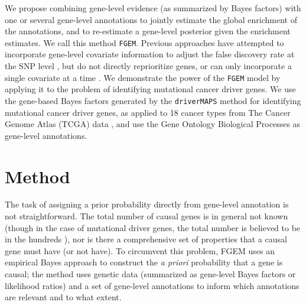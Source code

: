 We propose combining gene-level evidence (as summarized by Bayes factors) with one or several gene-level annotations to jointly estimate the global enrichment of the annotations, and to re-estimate a gene-level posterior given the enrichment estimates. We call this method \texttt{FGEM}.  Previous approaches have attempted to incorporate gene-level covariate information to adjust the false discovery rate at the SNP level \cite{Zablocki_2014}, but do not directly reprioritize genes, or can only incorporate a single covariate at a time \cite{rss-e}.  We demonstrate the power of the \texttt{FGEM} model by applying it to the problem of identifying mutational cancer driver genes. We use the gene-based Bayes factors generated by the \texttt{driverMAPS} method for identifying mutational cancer driver genes, as applied to 18 cancer types from The Cancer Genome Atlas (TCGA) data \cite{TCGA} \cite{drivermaps}, and use the Gene Ontology Biological Processes as gene-level annotations.





\section{Method}\label{sec:org4822ac5}

The task of assigning a prior probability directly from gene-level annotation is not straightforward.  The total number of causal genes is in general not known (though in the case of mutational driver genes, the total number is believed to be in the hundreds \cite{Bailey_2018}), nor is there a comprehensive set of properties that a causal gene must have (or not have).  To circumvent this problem, FGEM uses an empirical Bayes approach to construct the \emph{a priori} probability that a gene is causal; the method uses genetic data (summarized as gene-level Bayes factors or likelihood ratios) and a set of gene-level annotations to inform which annotations are relevant and to what extent.

